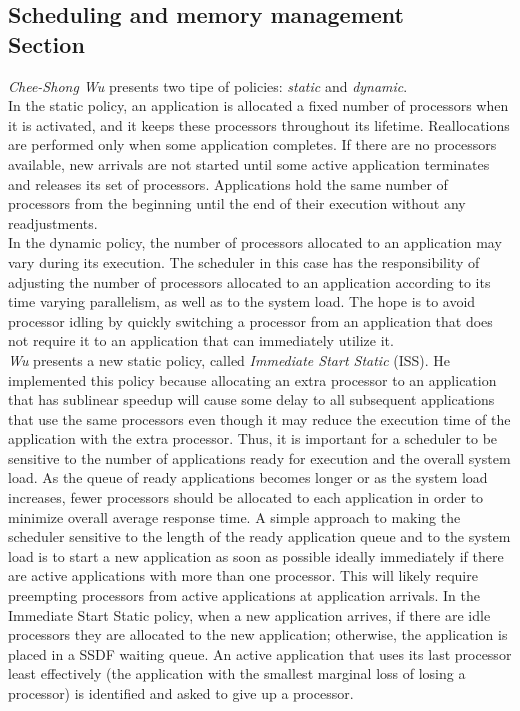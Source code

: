 \documentclass[a4paper,10pt]{article}
\begin{document}
\begin{multicols}{2}
\subsection{Scheduling and memory management \\ Section}
\emph{Chee-Shong Wu} \cite{Wu93processorscheduling} presents two tipe of policies: \emph{static} and \emph{dynamic}. \\
In the static policy, an application is allocated a fixed number of processors when it is activated, and it keeps these processors throughout its lifetime. Reallocations are performed only when some application completes. If there are no processors available, new arrivals are not started until some active application terminates and releases its set of processors. Applications hold the same number of processors from the beginning until the end of their execution without any readjustments.\\
In the dynamic policy, the number of processors allocated to an application may vary during its execution. The scheduler in this case has the responsibility of adjusting the number of processors allocated to an application according to its time varying parallelism, as well as to the system load. The hope is to avoid processor idling by quickly switching a processor from an application that does not require it to an application that can immediately utilize it.\\
\emph{Wu} presents a new static policy, called \emph{Immediate Start Static} (ISS). He implemented this policy because allocating an extra processor to an application that has sublinear speedup will cause some delay to all subsequent applications that use the same processors even though it may reduce the execution time of the application with the extra processor. Thus, it is important for a scheduler to be sensitive to the number of applications ready for execution and the overall system load. As the queue of ready applications becomes longer or as the system load increases, fewer processors should be allocated to each application in order to minimize overall average response time. A simple approach to making the scheduler sensitive to the length of the ready application queue and to the system load is to start a new application as soon as possible ideally immediately if there are active applications with more than one processor. This will likely require preempting processors from active applications at application arrivals. In the Immediate Start Static policy, when a new application arrives, if there are idle processors they are allocated to the new application; otherwise, the application is placed in a SSDF waiting queue. An active application that uses its last processor least effectively (the application with the smallest marginal loss of losing a processor) is identified and asked to give up a processor.

\end{multicols}
\end{document}
